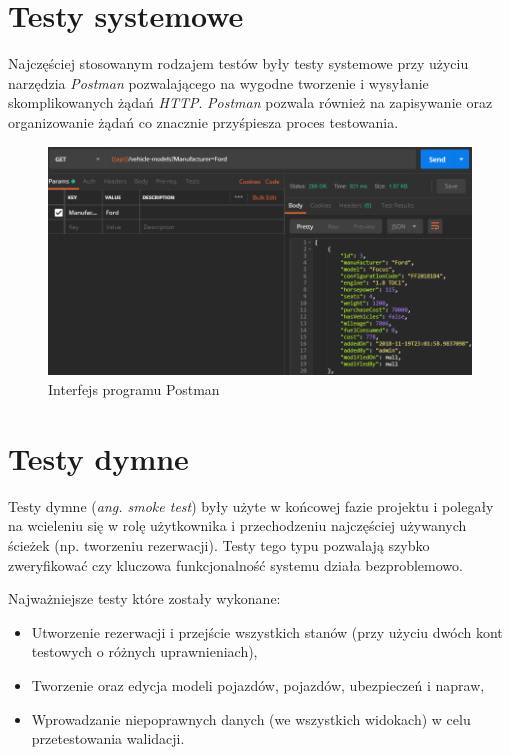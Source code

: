 \documentclass[eng,printmode,openany]{mgr}
\begin{document}
	\section{Testy systemowe}
	Najczęściej stosowanym rodzajem testów były testy systemowe przy użyciu narzędzia \textit{Postman} pozwalającego na wygodne tworzenie i wysyłanie skomplikowanych żądań \textit{HTTP}. \textit{Postman} pozwala również na zapisywanie oraz organizowanie żądań co znacznie przyśpiesza proces testowania.
	\begin{figure}[H]
		\centering
		\includegraphics[width=\textwidth]{images/tests_postman.png}
		\caption{Interfejs programu Postman}
	\end{figure}
	\section{Testy dymne}
	Testy dymne (\textit{ang. smoke test}) były użyte w końcowej fazie projektu i polegały na wcieleniu się w rolę użytkownika i przechodzeniu najczęściej używanych ścieżek (np. tworzeniu rezerwacji). Testy tego typu pozwalają szybko zweryfikować czy kluczowa funkcjonalność systemu działa bezproblemowo.
	
	Najważniejsze testy które zostały wykonane:
	\begin{itemize}
		\item Utworzenie rezerwacji i przejście wszystkich stanów (przy użyciu dwóch kont testowych o różnych uprawnieniach),
		\item Tworzenie oraz edycja modeli pojazdów, pojazdów, ubezpieczeń i napraw,
		\item Wprowadzanie niepoprawnych danych (we wszystkich widokach) w celu przetestowania walidacji.
	\end{itemize}
	
	\newpage
\end{document}
